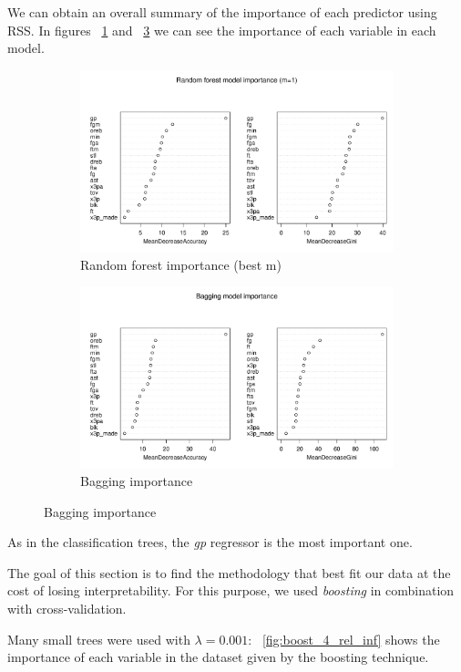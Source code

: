 We can obtain an overall summary of the importance of each predictor using RSS.
In figures \Fig~\ref{fig:best_for_500_var_imp_plot} and \Fig~\ref{fig:bagg_500_var_imp_plot} we can see the importance of each variable in each model.

\begin{figure}[h]
	\centering
	\begin{subfigure}{.5\textwidth}
		\centering
		\includegraphics[width=0.5\linewidth]{ImageFiles/Classification/Trees/best_for_500_var_imp_plot}
		\caption{Random forest importance (best m)}
		\label{fig:best_for_500_var_imp_plot}
	\end{subfigure}%
	\hfill
	\begin{subfigure}{.5\textwidth}
		\centering
		\includegraphics[width=0.5\linewidth]{ImageFiles/Classification/Trees/bagg_500_var_imp_plot}
		\caption{Bagging importance}
		\label{fig:bagg_500_var_imp_plot}
	\end{subfigure}
\end{figure}

\noindent
As in the classification trees, the \textit{gp} regressor is the most important one.

The goal of this section is to find the methodology that best fit our data at the cost of losing interpretability. For this purpose, we used \textit{boosting} in combination with cross-validation.

Many small trees were used with $\lambda = 0.001$: \Fig~\ref{fig:boost_4_rel_inf} shows the importance of each variable in the dataset given by the boosting technique.

